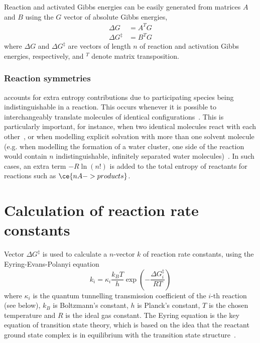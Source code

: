 Reaction and activated Gibbs energies can be easily generated from matrices $A$ and $B$ using the $G$ vector of absolute Gibbs energies,
% 
\begin{equation}
	\begin{split}
		\Delta G &= A^T G \\
		\Delta G^\ddagger &= B^T G
	\end{split}
\end{equation}
% 
where $\Delta G$ and $\Delta G^\ddagger$ are vectors of length $n$ of reaction and activation Gibbs energies,
respectively,
and $^T$ denote matrix transposition.

\subsubsection{Reaction symmetries}

\overreact{} accounts for extra entropy contributions due to participating species being indistinguishable in a reaction.
This occurs whenever it is possible to interchangeably translate molecules of identical configurations~\cite{Fern_ndez_Ramos_2007,Gilson_2010}.
This is particularly important,
for instance,
when two identical molecules react with each other~\cite{Fern_ndez_Ramos_2007,Gilson_2010},
or when modelling explicit solvation with more than one solvent molecule (e.g.
when modelling the formation of a water cluster,
one side of the reaction would contain $n$ indistinguishable,
infinitely separated water molecules)~\cite{Jensen_2015}.
In such cases,
an extra term $-R \ln{\left( n! \right)}$ is added to the total entropy of reactants for reactions such as $\ce{n A -> products}$.

\section{Calculation of reaction rate constants}%
\label{sec:rates}

Vector $\Delta G^\ddagger$ is used to calculate a $n$-vector $k$ of reaction rate constants,
using the Eyring-Evans-Polanyi equation~\cite{Eyring_1935,Evans_1935}
% 
\begin{equation}\label{eq:rate-consts}
	k_i = \kappa_i \frac{k_B T}{h}
	\exp \left(-\frac{\Delta G_i^\ddagger}{R T} \right)
\end{equation}
% 
where $\kappa_i$ is the quantum tunnelling transmission coefficient of the $i$-th reaction (see below),
$k_B$ is Boltzmann's constant,
$h$ is Planck's constant,
$T$ is the chosen temperature and $R$ is the ideal gas constant.
The Eyring equation is the key equation of transition state theory, which is based
on the idea that the reactant ground state complex is in equilibrium
with the transition state structure~\cite{TransitionStateTheory}.

